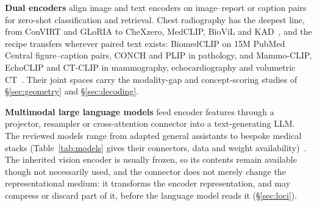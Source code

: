 \textbf{Dual encoders} align image and text encoders on image--report or caption pairs for zero-shot
classification and retrieval. Chest radiography has the deepest line, from ConVIRT and GLoRIA to CheXzero,
MedCLIP, BioViL and KAD~\cite{zhang2020visual,huang2021gloria,tiu2022detection,wang2022medclip,boecking2022most,zhang2023visuallanguage},
and the recipe transfers wherever paired text exists: BiomedCLIP on 15M PubMed Central figure--caption pairs,
CONCH and PLIP in pathology, and Mammo-CLIP, EchoCLIP and CT-CLIP in mammography, echocardiography and
volumetric CT~\cite{zhang2023biomedclip,lu2024visuallanguage,huang2023visual,ghosh2024mammoclip,christensen2024vision,hamamci2024ctrate}.
Their joint spaces carry the modality-gap and concept-scoring studies of \S\ref{sec:geometry} and
\S\ref{sec:decoding}.

\textbf{Multimodal large language models} feed encoder features through a projector, resampler or
cross-attention connector into a text-generating LLM. The reviewed models range from adapted general assistants to bespoke medical stacks
(Table~\ref{tab:models} gives their connectors, data and weight
availability)~\cite{li2023llavamed,moor2023medflamingo,bannur2024maira2,chen2024model,chaves2024clinically,wu2023model,chen2024huatuogptvision,tu2023biomedical,sellergren2025medgemma,team2025lingshu}. The inherited vision encoder is usually frozen, so its contents remain available though not
necessarily used, and the connector does not merely change the representational medium: it transforms the
encoder representation, and may compress or discard part of it, before the language model reads it
(\S\ref{sec:loci}).

